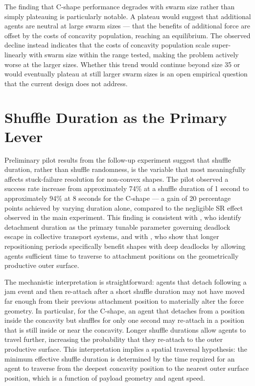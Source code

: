 The finding that C-shape performance degrades with swarm size rather than simply plateauing is particularly notable. A plateau would suggest that additional agents are neutral at large swarm sizes — that the benefits of additional force are offset by the costs of concavity population, reaching an equilibrium. The observed decline instead indicates that the costs of concavity population scale super-linearly with swarm size within the range tested, making the problem actively worse at the larger sizes. Whether this trend would continue beyond size 35 or would eventually plateau at still larger swarm sizes is an open empirical question that the current design does not address.

\section{Shuffle Duration as the Primary Lever}
\label{sec:disc_duration}

Preliminary pilot results from the follow-up experiment suggest that shuffle duration, rather than shuffle randomness, is the variable that most meaningfully affects stuck-failure resolution for non-convex shapes. The pilot observed a success rate increase from approximately 74\% at a shuffle duration of 1 second to approximately 94\% at 8 seconds for the C-shape — a gain of 20 percentage points achieved by varying duration alone, compared to the negligible SR effect observed in the main experiment. This finding is consistent with \citet{wilson2014}, who identify detachment duration as the primary tunable parameter governing deadlock escape in collective transport systems, and with \citet{springer2022}, who show that longer repositioning periods specifically benefit shapes with deep deadlocks by allowing agents sufficient time to traverse to attachment positions on the geometrically productive outer surface.

The mechanistic interpretation is straightforward: agents that detach following a jam event and then re-attach after a short shuffle duration may not have moved far enough from their previous attachment position to materially alter the force geometry. In particular, for the C-shape, an agent that detaches from a position inside the concavity but shuffles for only one second may re-attach in a position that is still inside or near the concavity. Longer shuffle durations allow agents to travel further, increasing the probability that they re-attach to the outer productive surface. This interpretation implies a spatial traversal hypothesis: the minimum effective shuffle duration is determined by the time required for an agent to traverse from the deepest concavity position to the nearest outer surface position, which is a function of payload geometry and agent speed.

